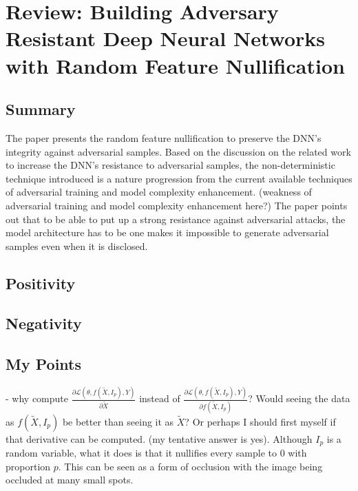 \documentclass[a4paper,10pt]{article}
\theoremstyle{definition}
\begin{document}
\section*{Review: Building Adversary Resistant Deep Neural Networks with Random Feature Nullification}
\subsection*{Summary}
The paper presents the random feature nullification to preserve the DNN's integrity against adversarial samples. Based on the discussion on the related work to increase the DNN's resistance to adversarial samples, the non-deterministic technique introduced is a nature progression from the current available techniques of adversarial training and model complexity enhancement. (weakness of adversarial training and model complexity enhancement here?) The paper points out that to be able to put up a strong resistance against adversarial attacks, the model architecture has to be one makes it impossible to generate adversarial samples even when it is disclosed.





\subsection*{Positivity}




\subsection*{Negativity}

\subsection*{My Points}
- why compute  $\frac{\partial \mathcal{L}(\theta, f(\tilde{X},I_p),Y)}{\partial \tilde{X}}$ instead of  $\frac{\partial \mathcal{L}(\theta, f(\tilde{X},I_p),Y)}{\partial  f(\tilde{X},I_p)}$? Would seeing the data as $f(\tilde{X},I_p)$  be better than seeing it as $\tilde{X}$? Or perhaps I should first myself if that derivative can be computed. (my tentative answer is yes). Although $I_p$ is a random variable, what it does is that it nullifies every sample to 0 with proportion $p$. This can be seen as a form of occlusion with the image being occluded at many small spots.
\end{document}
